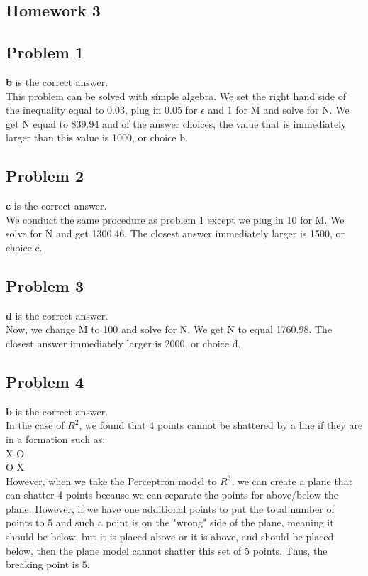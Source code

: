 \documentclass[12 pt]{article}
\begin{document}
	\begin{center}
		\section*{Homework 3}
	\end{center}
	
	
	\subsection*{Problem 1}	
	\textbf{b} is the correct answer. \\
	This problem can be solved with simple algebra. We set the right hand side of the inequality equal to 0.03, plug in 0.05 for $\epsilon$ and 1 for M and solve for N. We get N equal to 839.94 and of the answer choices, the value that is immediately larger than this value is 1000, or choice b.
	
	\subsection*{Problem 2}
	\textbf{c} is the correct answer. \\
	We conduct the same procedure as problem 1 except we plug in 10 for M. We solve for N and get 1300.46. The closest answer immediately larger is 1500, or choice c.

	
	\subsection*{Problem 3}
	\textbf{d} is the correct answer.\\
	Now, we change M to 100 and solve for N. We get N to equal 1760.98. The closest answer immediately larger is 2000, or choice d.
	
	
	\subsection*{Problem 4}
	\textbf{b} is the correct answer.\\
	In the case of $R^2$, we found that 4 points cannot be shattered by a line if they are in a formation such as: \\
	
	X   	 O \\
	\indent O  	  X \\ 
	
	\noindent However, when we take the Perceptron model to $R^3$, we can create a plane that can shatter 4 points because we can separate the points for above/below the plane. However, if we have one additional points to put the total number of points to 5 and such a point is on the "wrong" side of the plane, meaning it should be below, but it is placed above or it is above, and should be placed below, then the plane model cannot shatter this set of 5 points. Thus, the breaking point is 5.
\end{document}
